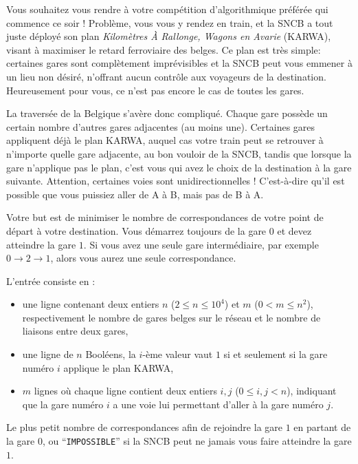 \problemname{\problemyamlname}


Vous souhaitez vous rendre à votre compétition d'algorithmique préférée qui commence ce soir ! Problème, vous vous y rendez en train, et la SNCB a tout juste déployé son plan \emph{Kilomètres À Rallonge, Wagons en Avarie} (KARWA), visant à maximiser le retard ferroviaire des belges. Ce plan est très simple: certaines gares sont complètement imprévisibles et la SNCB peut vous emmener à un lieu non désiré, n'offrant aucun contrôle aux voyageurs de la destination. Heureusement pour vous, ce n'est pas encore le cas de toutes les gares.

La traversée de la Belgique s'avère donc compliqué. Chaque gare possède un certain nombre d'autres gares adjacentes (au moins une). Certaines gares appliquent déjà le plan KARWA, auquel cas votre train peut se retrouver à n'importe quelle gare adjacente, au bon vouloir de la SNCB, tandis que lorsque la gare n'applique pas le plan, c'est vous qui avez le choix de la destination à la gare suivante. Attention, certaines voies sont unidirectionnelles ! C'est-à-dire qu'il est possible que vous puissiez aller de A à B, mais pas de B à A.

Votre but est de minimiser le nombre de correspondances de votre point de départ à votre destination. Vous démarrez toujours de la gare $0$ et devez atteindre la gare $1$. Si vous avez une seule gare intermédiaire, par exemple $0 \rightarrow 2 \rightarrow 1$, alors vous aurez une seule correspondance.

\begin{Input}
	L'entrée consiste en :
	\begin{itemize}
		\item une ligne contenant deux entiers $n$ ($2 \le n \le 10^4$) et $m$ ($0 < m \le n^2$), respectivement le nombre de gares belges sur le réseau et le nombre de liaisons entre deux gares,
		\item une ligne de $n$ Booléens, la $i$-ème valeur vaut $1$ si et seulement si la gare numéro $i$ applique le plan KARWA,
		\item $m$ lignes où chaque ligne contient deux entiers $i, j$ ($0 \leq i,j < n$), indiquant que la gare numéro $i$ a une voie lui permettant d'aller à la gare numéro $j$.
	\end{itemize}
\end{Input}

\begin{Output}
	Le plus petit nombre de correspondances afin de rejoindre la gare $1$ en partant de la gare $0$, ou ``\texttt{IMPOSSIBLE}'' si la SNCB peut ne jamais vous faire atteindre la gare $1$.
\end{Output}

